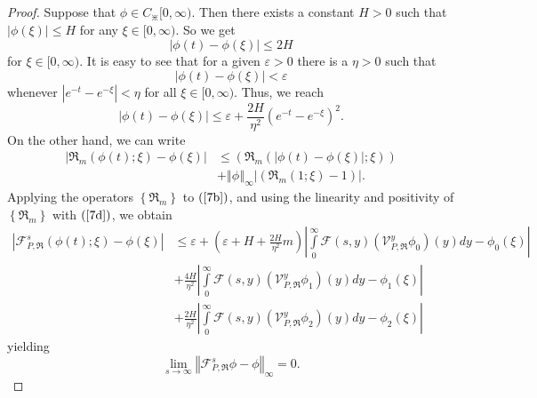 \documentclass{amsart}
\theoremstyle{plain}
\numberwithin{equation}{section}
\begin{document}
\begin{proof}
Suppose that $\phi \in C_{\divideontimes}[0,\infty)$. Then there exists a
constant $H>0$ such that $\left \vert \phi(\xi)\right \vert \leq H$ for any
$\xi \in \lbrack0,\infty).$ So we get
\begin{equation}
\left \vert \phi \left(  t\right)  -\phi \left(  \xi \right)  \right \vert
\leq2H\label{7a}%
\end{equation}
for $\xi \in \lbrack0,\infty).$ It is easy to see that for a given
$\varepsilon>0$ there is a $\eta>0$ such that%
\[
\left \vert \phi \left(  t\right)  -\phi \left(  \xi \right)  \right \vert
<\varepsilon
\]
whenever $\left \vert e^{-t}-e^{-\xi}\right \vert <\eta$ for all $\xi \in
\lbrack0,\infty).$ Thus, we reach
\begin{equation}
\left \vert \phi \left(  t\right)  -\phi \left(  \xi \right)  \right \vert
\leq \varepsilon+\frac{2H}{\eta^{2}}\left(  e^{-t}-e^{-\xi}\right)
^{2}.\label{7b}%
\end{equation}
On the other hand, we can write
\begin{align}
\left \vert \Re_{m}\left(  \phi \left(  t\right)  ;\xi \right)  -\phi \left(
\xi \right)  \right \vert  &  \leq \left(  \Re_{m}\left(  \left \vert \phi \left(
t\right)  -\phi \left(  \xi \right)  \right \vert ;\xi \right)  \right)
\nonumber \\
&  +\left \Vert \phi \right \Vert _{\infty}\left \vert \left(  \Re_{m}\left(
1;\xi \right)  -1\right)  \right \vert .\label{7d}%
\end{align}
Applying the operators $\left \{  \Re_{m}\right \}  $ to $\left(  \ref{7b}%
\right)  $, and using the linearity and positivity of $\left \{  \Re
_{m}\right \}  $ with $\left(  \ref{7d}\right)  $, we obtain
\begin{align*}
\left \vert
\mathcal{F}%
_{P,\Re}^{s}\left(  \phi \left(  t\right)  ;\xi \right)  -\phi \left(
\xi \right)  \right \vert  &  \leq \varepsilon+\left(  \varepsilon+H+\frac
{2H}{\eta^{2}}m\right)  \left \vert
{\displaystyle \int \limits_{0}^{\infty}}
\mathcal{F}%
(s,y)\left(  \mathcal{V}_{P,\Re}^{y}\phi_{0}\right)  \left(  y\right)
dy-\phi_{0}(\xi)\right \vert \\
&  +\frac{4H}{\eta^{2}}\left \vert
{\displaystyle \int \limits_{0}^{\infty}}
\mathcal{F}%
(s,y)\left(  \mathcal{V}_{P,\Re}^{y}\phi_{1}\right)  \left(  y\right)
dy-\phi_{1}(\xi)\right \vert \\
&  +\frac{2H}{\eta^{2}}\left \vert
{\displaystyle \int \limits_{0}^{\infty}}
\mathcal{F}%
(s,y)\left(  \mathcal{V}_{P,\Re}^{y}\phi_{2}\right)  \left(  y\right)
dy-\phi_{2}(\xi)\right \vert
\end{align*}
yielding
\[
\lim_{s\rightarrow \infty}\left \Vert
\mathcal{F}%
_{P,\Re}^{s}\phi-\phi \right \Vert _{\infty}=0.
\]


\end{proof}
\end{document}
